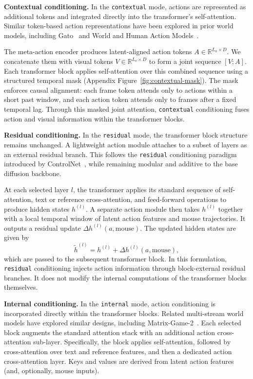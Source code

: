 \noindent\textbf{Contextual conditioning.}
In the \texttt{contextual} mode, actions are represented as additional tokens and integrated directly into the transformer’s self-attention.
Similar token-based action representations have been explored in prior world models, including Gato~\citep{reed2022generalist} and World and Human Action Models~\citep{kanervisto2025world}.

The meta-action encoder produces latent-aligned action tokens $A \in \mathbb{R}^{L_a \times D}$.
We concatenate them with visual tokens $V \in \mathbb{R}^{L_v \times D}$ to form a joint sequence $[V; A]$.
Each transformer block applies self-attention over this combined sequence using a structured temporal mask (Appendix Figure~\ref{fig:contextual-mask}).
The mask enforces causal alignment: each frame token attends only to actions within a short past window, and each action token attends only to frames after a fixed temporal lag.
Through this masked joint attention, \texttt{contextual} conditioning fuses action and visual information within the transformer blocks.

\noindent\textbf{Residual conditioning.}
In the \texttt{residual} mode, the transformer block structure remains unchanged.
A lightweight action module attaches to a subset of layers as an external residual branch.
This follows the \texttt{residual} conditioning paradigm introduced by ControlNet~\citep{zhang2023adding}, while remaining modular and additive to the base diffusion backbone.

At each selected layer $l$, the transformer applies its standard sequence of self-attention, text or reference cross-attention, and feed-forward operations to produce hidden states $h^{(l)}$.
A separate action module then takes $h^{(l)}$ together with a local temporal window of latent action features and mouse trajectories.
It outputs a residual update $\Delta h^{(l)}(a,\text{mouse})$.
The updated hidden states are given by
\[
  \tilde{h}^{(l)} = h^{(l)} + \Delta h^{(l)}(a,\text{mouse}),
\]
which are passed to the subsequent transformer block.
In this formulation, \texttt{residual} conditioning injects action information through block-external residual branches.
It does not modify the internal computations of the transformer blocks themselves.

\noindent\textbf{Internal conditioning.}
In the \texttt{internal} mode, action conditioning is incorporated directly within the transformer blocks.
Related multi-stream world models have explored similar designs, including Matrix-Game-2~\citep{he2025matrix}.
Each selected block augments the standard attention stack with an additional action cross-attention sub-layer.
Specifically, the block applies self-attention, followed by cross-attention over text and reference features, and then a dedicated action cross-attention layer.
Keys and values are derived from latent action features (and, optionally, mouse inputs).

